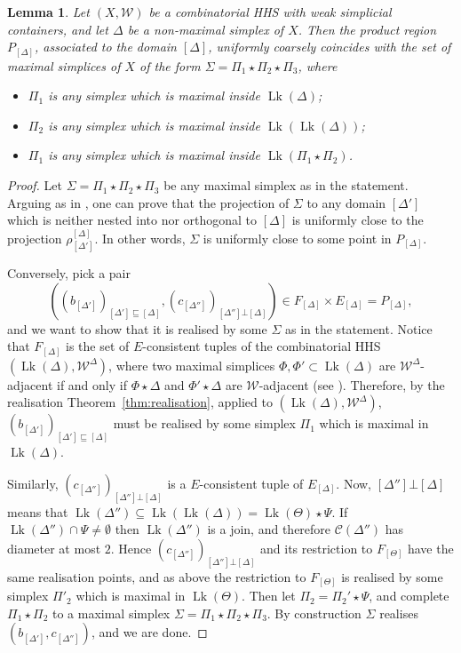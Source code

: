 \documentclass[svgnames]{amsart}
\theoremstyle{plain}
\newtheorem{lemma}[thm]{Lemma}
\theoremstyle{definition}
\newcommand{\C}{\mathcal C}
\newcommand{\nest}{\sqsubseteq}
\newcommand{\orth}{\bot}
\newcommand{\link}{\operatorname{Lk}}
\newcommand{\W}{\mathcal{W}}
\begin{document}
\begin{lemma}\label{lem:PR_in_CHHS}
    Let $(X,\W)$ be a combinatorial HHS with weak simplicial containers, and let $\Delta$ be a non-maximal simplex of $X$. Then the product region $P_{[\Delta]}$, associated to the domain $[\Delta]$, uniformly coarsely coincides with the set of maximal simplices of $X$ of the form $\Sigma=\Pi_1\star\Pi_2\star\Pi_3$, where
    \begin{itemize}
        \item $\Pi_1$ is any simplex which is maximal inside $\link(\Delta)$;
        \item $\Pi_2$ is any simplex which is maximal inside $\link(\link(\Delta))$;
        \item $\Pi_1$ is any simplex which is maximal inside $\link(\Pi_1\star\Pi_2)$.
    \end{itemize}
\end{lemma}


\begin{proof}
Let $\Sigma=\Pi_1\star\Pi_2\star\Pi_3$ be any maximal simplex as in the statement. Arguing as in \cite[Section 5.2, \textbf{partial realization}]{BHMS}, one can prove that the projection of $\Sigma$ to any domain $[\Delta']$ which is neither nested into nor orthogonal to $[\Delta]$ is uniformly close to the projection $\rho^{[\Delta]}_{[\Delta']}$. In other words, $\Sigma$ is uniformly close to some point in $P_{[\Delta]}$.
\par\medskip
Conversely, pick a pair $$((b_{[\Delta']})_{[\Delta']\nest [\Delta]}, (c_{[\Delta'']})_{[\Delta'']\orth [\Delta]})\in F_{[\Delta]} \times E_{[\Delta]}=P_{[\Delta]},$$ and we want to show that it is realised by some $\Sigma$ as in the statement. Notice that $F_{[\Delta]}$ is the set of $E$-consistent tuples of the combinatorial HHS $(\link(\Delta), \W^\Delta)$, where two maximal simplices $\Phi,\Phi'\subset\link(\Delta)$ are $\W^\Delta$-adjacent if and only if $\Phi\star \Delta$ and $\Phi'\star \Delta$ are $\W$-adjacent (see \cite[Theorem 4.9]{BHMS}). Therefore, by the realisation Theorem~\ref{thm:realisation}, applied to $(\link(\Delta), \W^\Delta)$, $(b_{[\Delta']})_{[\Delta']\nest [\Delta]}$ must be realised by some simplex $\Pi_1$ which is maximal in $\link(\Delta)$. 

Similarly, $(c_{[\Delta'']})_{[\Delta'']\orth [\Delta]}$ is a $E$-consistent tuple of $E_{[\Delta]}$. Now, $[\Delta'']\orth [\Delta]$ means that $\link(\Delta'')\subseteq \link(\link(\Delta))=\link(\Theta)\star\Psi$. If $\link(\Delta'')\cap\Psi\neq\emptyset$ then $\link(\Delta'')$ is a join, and therefore $\C(\Delta'')$ has diameter at most $2$. Hence  $(c_{[\Delta'']})_{[\Delta'']\orth [\Delta]}$ and its restriction to $F_{[\Theta]}$ have the same realisation points, and as above the restriction to $F_{[\Theta]}$ is realised by some simplex $\Pi'_2$ which is maximal in $\link(\Theta)$. Then let $\Pi_2=\Pi_2'\star\Psi$, and complete $\Pi_1\star\Pi_2$ to a maximal simplex $\Sigma=\Pi_1\star\Pi_2\star\Pi_3$. By construction $\Sigma$ realises $(b_{[\Delta']}, c_{[\Delta'']})$, and we are done.
\end{proof}
\end{document}
